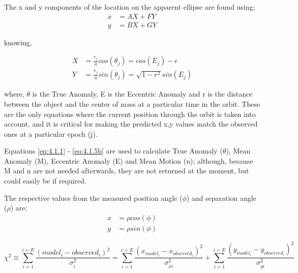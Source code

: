 \documentclass[10pt,preprint]{aastex}
\begin{document}
The x and y components of the location on the apparent ellipse are found using:
\begin{subequations}
\begin{align}\label{eq:28-1a}
x& = AX+FY\\
\label{eq:28-1b}
y& = BX + GY
\end{align}
\end{subequations}

knowing,

\begin{subequations}
\begin{align}\label{eq:28-1.5a}
X& = \frac{r_j}{a}cos(\theta_j) = cos(E_j)-e\\
\label{eq:28-1.5b}
Y& = \frac{r_j}{a}sin(\theta_j) = \sqrt{1-e^2}sin(E_j) 
\end{align}
\end{subequations}

where, $\theta$ is the True Anomaly, E is the Eccentric Anomaly and r is the distance between the object and the center of mass at a particular time in the orbit.  These are the only equations where the current position through the orbit is taken into account, and it is critical for making the predicted x,y values match the observed ones at a particular epoch (j).

Equations \ref{eq:4.1.1} - \ref{eq:4.1.5b} are used to calculate True Anomaly ($\theta$), Mean Anomaly (M), Eccentric Anomaly (E) and Mean Motion (n); although, because M and n are not needed afterwards, they are not returned at the moment, but could easily be if required.

The respective values from the measured position angle ($\phi$) and separation angle ($\rho$) are:
\begin{subequations}
\begin{align}\label{eq:28-2a}
x& = \rho cos(\phi)\\
\label{eq:28-2b}
y& = \rho sin(\phi)
\end{align}
\end{subequations}

\begin{equation}\label{eq:33}
\chi^{2} \equiv  \sum_{i=1}^{i=E} \frac{(model_i - observed_i)^{2}}{\sigma^{2}_i} = \sum_{i=1}^{i=E} \frac{(x_{model_i}-x_{observed_i}) ^{2}}{\sigma^{2}_{xi}} +\sum_{i=1}^{i=E} \frac{(y_{model_i}-y_{observed_i}) ^{2}}{\sigma^{2}_{yi}}
\end{equation}
\end{document}
